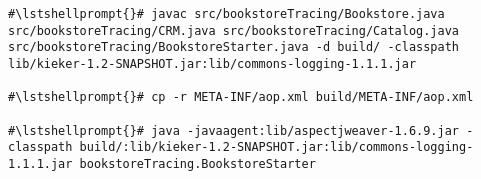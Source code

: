 \begin{lstlisting}[caption=Command to compile and run the instrumented Bookstore under Linux]
#\lstshellprompt{}# javac src/bookstoreTracing/Bookstore.java src/bookstoreTracing/CRM.java src/bookstoreTracing/Catalog.java src/bookstoreTracing/BookstoreStarter.java -d build/ -classpath lib/kieker-1.2-SNAPSHOT.jar:lib/commons-logging-1.1.1.jar

#\lstshellprompt{}# cp -r META-INF/aop.xml build/META-INF/aop.xml

#\lstshellprompt{}# java -javaagent:lib/aspectjweaver-1.6.9.jar -classpath build/:lib/kieker-1.2-SNAPSHOT.jar:lib/commons-logging-1.1.1.jar bookstoreTracing.BookstoreStarter
\end{lstlisting}
